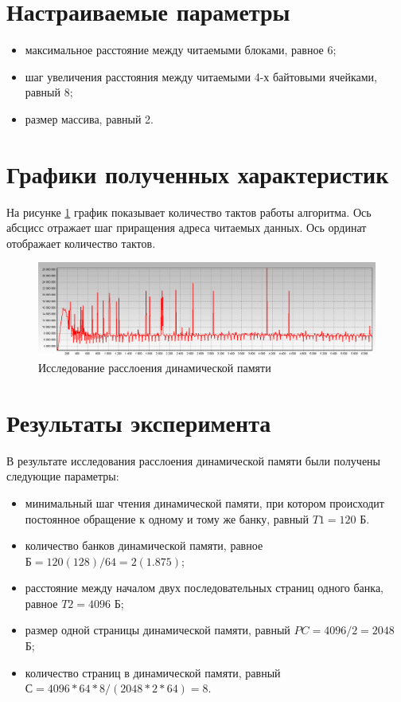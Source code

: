 \section{Настраиваемые параметры}

\begin{itemize}
	\item максимальное расстояние между читаемыми блоками, равное 6;
	\item шаг увеличения расстояния между читаемыми 4-х байтовыми ячейками, равный 8;
	\item размер массива, равный 2.
\end{itemize}

\section{Графики полученных характеристик}

На рисунке \ref{img:delimitation} график показывает количество тактов работы алгоритма. Ось абсцисс отражает шаг приращения адреса читаемых данных. Ось ординат отображает количество тактов.

\begin{figure}[H]
	\begin{center}
		\includegraphics[scale=0.3]{img/delimitation.jpg}
	\end{center}
	\captionsetup{justification=centering}
	\caption{Исследование расслоения динамической памяти}
	\label{img:delimitation}
\end{figure}

\section{Результаты эксперимента}

В результате исследования расслоения динамической памяти были получены следующие параметры:

\begin{itemize}
	\item минимальный шаг чтения динамической памяти, при котором происходит постоянное обращение к одному и тому же банку, равный $T1 = 120$ Б.
	\item количество банков динамической памяти, равное $Б = 120(128) / 64 = 2(1.875)$; 
	\item расстояние между началом двух последовательных страниц одного банка, равное $T2 = 4096$ Б;
	\item размер одной страницы динамической памяти, равный $PC = 4096 / 2 = 2048$ Б;
	\item количество страниц в динамической памяти, равный $С =  4096 * 64 * 8 / (2048 * 2 * 64) = 8$.
\end{itemize}

